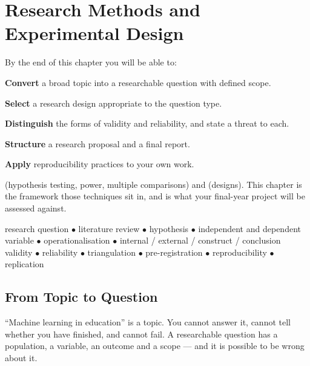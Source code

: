 \chapter{Research Methods and Experimental Design}\label{ch:research}

\begin{outcomes}
By the end of this chapter you will be able to:
\begin{tight}
  \item \textbf{Convert} a broad topic into a researchable question with defined scope.
  \item \textbf{Select} a research design appropriate to the question type.
  \item \textbf{Distinguish} the forms of validity and reliability, and state a threat to each.
  \item \textbf{Structure} a research proposal and a final report.
  \item \textbf{Apply} reproducibility practices to your own work.
\end{tight}
\end{outcomes}

\begin{prereq}
 (hypothesis testing, power, multiple comparisons) and
 (designs). This chapter is the framework those techniques sit in,
and is what your final-year project will be assessed against.
\end{prereq}

\begin{keyterms}
research question $\bullet$ literature review $\bullet$ hypothesis $\bullet$
independent and dependent variable $\bullet$ operationalisation $\bullet$
internal / external / construct / conclusion validity $\bullet$ reliability
$\bullet$ triangulation $\bullet$ pre-registration $\bullet$ reproducibility
$\bullet$ replication
\end{keyterms}

\section{From Topic to Question}

\begin{alertbox}
``Machine learning in education'' is a topic. You cannot answer it, cannot tell
whether you have finished, and cannot fail. A researchable question has a
population, a variable, an outcome and a scope --- and it is possible to be wrong
about it.
\end{alertbox}

